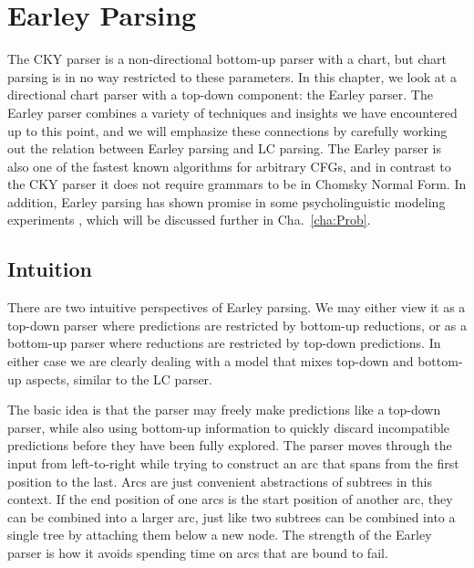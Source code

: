 \chapter{Earley Parsing}
\label{cha:Earley}

The CKY parser is a non-directional bottom-up parser with a chart, but chart parsing is in no way restricted to these parameters.
In this chapter, we look at a directional chart parser with a top-down component: the Earley parser.
The Earley parser combines a variety of techniques and insights we have encountered up to this point, and we will emphasize these connections by carefully working out the relation between Earley parsing and LC parsing.
The Earley parser is also one of the fastest known algorithms for arbitrary CFGs, and in contrast to the CKY parser it does not require grammars to be in Chomsky Normal Form.
In addition, Earley parsing has shown promise in some psycholinguistic modeling experiments \citep{Hale01}, which will be discussed further in Cha.~\ref{cha:Prob}.


\section{Intuition}

There are two intuitive perspectives of Earley parsing.
We may either view it as a top-down parser where predictions are restricted by bottom-up reductions, or as a bottom-up parser where reductions are restricted by top-down predictions.
In either case we are clearly dealing with a model that mixes top-down and bottom-up aspects, similar to the LC parser.

The basic idea is that the parser may freely make predictions like a top-down parser, while also using bottom-up information to quickly discard incompatible predictions before they have been fully explored.
The parser moves through the input from left-to-right while trying to construct an arc that spans from the first position to the last.
Arcs are just convenient abstractions of subtrees in this context.
If the end position of one arcs is the start position of another arc, they can be combined into a larger arc, just like two subtrees can be combined into a single tree by attaching them below a new node.
The strength of the Earley parser is how it avoids spending time on arcs that are bound to fail.

